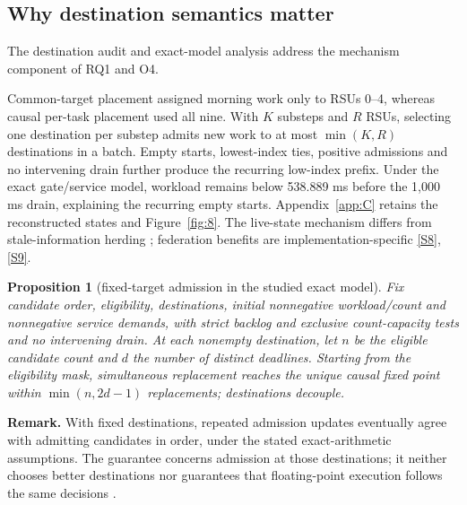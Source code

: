 \documentclass[12pt,a4paper]{article}
\newtheorem{proposition}{Proposition}
\begin{document}
\FloatBarrier
\subsection{Why destination semantics matter}\label{sec:3.5}

The destination audit and exact-model analysis address the mechanism component of RQ1 and O4.

Common-target placement assigned morning work only to RSUs 0--4, whereas causal per-task placement used all nine. With $K$ substeps and $R$ RSUs, selecting one destination per substep admits new work to at most $\min(K,R)$ destinations in a batch. Empty starts, lowest-index ties, positive admissions and no intervening drain further produce the recurring low-index prefix. Under the exact gate/service model, workload remains below 538.889 ms before the 1,000 ms drain, explaining the recurring empty starts. Appendix~\ref{app:C} retains the reconstructed states and Figure~\ref{fig:8}. The live-state mechanism differs from stale-information herding \cite{ref45}; federation benefits are implementation-specific \cite{ref46} \hyperref[source-s8]{[S8]}, \hyperref[source-s9]{[S9]}.

\begin{proposition}[fixed-target admission in the studied exact model]\label{prop:1}
Fix candidate order, eligibility, destinations, initial nonnegative workload/count and nonnegative service demands, with strict backlog and exclusive count-capacity tests and no intervening drain. At each nonempty destination, let $n$ be the eligible candidate count and $d$ the number of distinct deadlines. Starting from the eligibility mask, simultaneous replacement reaches the unique causal fixed point within $\min(n,2d-1)$ replacements; destinations decouple.\end{proposition}

\textbf{Remark.} With fixed destinations, repeated admission updates eventually agree with admitting candidates in order, under the stated exact-arithmetic assumptions. The guarantee concerns admission at those destinations; it neither chooses better destinations nor guarantees that floating-point execution follows the same decisions \cite{ref41}.
\end{document}
